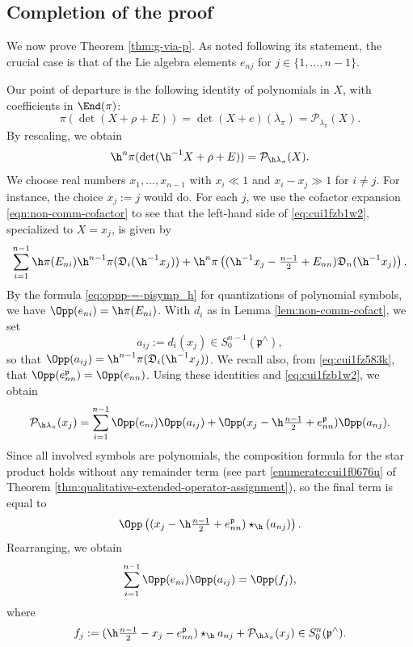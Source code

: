 \subsection{Completion of the proof}\label{sec:completion-proof-2}
We now prove Theorem \ref{thm:g-via-p}.  As noted following its statement, the crucial case is that of the Lie algebra elements $e_{n j}$ for $j \in \{1,\dotsc,n-1\}$.

Our point of departure is the following identity of polynomials in $X$, with coefficients in $\End(\pi)$:
\[
  \pi(\det(X + \rho + E)) = \det(X+e)(\lambda_\pi) = \mathcal{P}_{\lambda_\pi}(X).
\]
By rescaling, we obtain
\begin{equation}\label{eq:cui1fzb1w2}
  \h^{n} \pi(\det(\h^{-1} X + \rho + E)) = \mathcal{P}_{\h \lambda_\pi}(X).
\end{equation}
We choose real numbers $x_1,\dotsc,x_{n-1}$ with $x_i \ll 1$ and $x_i - x_j \gg 1$ for $i \neq j$.  For instance, the choice $x_j := j$ would do.  For each $j$, we use the cofactor expansion \eqref{eqn:non-comm-cofactor} to see that the left-hand side of \eqref{eq:cui1fzb1w2}, specialized to $X = x_j$, is given by
\begin{equation*}
  \sum_{i=1}^{n-1}
  \h \pi(E_{n i}) \h^{n-1}\pi(\mathfrak{D}_i(\h^{-1} x_j))
  + \h^n \pi \left(
    (\h^{-1}x_j - \tfrac{n-1}{2} + E_{n n})\mathfrak{D}_n(\h^{-1} x_j)
  \right).
\end{equation*}
By the formula \eqref{eq:oppp-=-pisymp_h} for quantizations of polynomial symbols, we have $\Opp(e_{n i}) = \h \pi(E_{n i})$.  With $d_i$ as in Lemma \ref{lem:non-comm-cofact}, we set
\begin{equation}\label{eq:aijdixj}
  a_{i j} := d_i(x_j) \in S^{n-1}_0(\mathfrak{p}^\wedge),
\end{equation}
so that $\Opp(a_{i j}) = \h^{n-1}\pi( \mathfrak{D}_i(\h^{-1} x_j))$.  We recall also, from \eqref{eq:cui1fz583k}, that $\Opp(e_{n n}^{\mathfrak{p}}) = \Opp(e_{n n})$.  Using these identities and \eqref{eq:cui1fzb1w2}, we obtain
\begin{equation*}
  \mathcal{P}_{\h \lambda_\pi}(x_j)
  =
  \sum_{i=1}^{n-1}
  \Opp(e_{n i}) \Opp(a_{i j})
  + \Opp (x_j - \h \tfrac{n-1}{2} + e_{n n}^{\mathfrak{p}}) \Opp(a_{n j}).
\end{equation*}
Since all involved symbols are polynomials, the composition formula for the star product holds without any remainder term (see part \eqref{enumerate:cui1f0676u} of Theorem \ref{thm:qualitative-extended-operator-assignment}), so the final term is equal to
\begin{equation*}
  \Opp \left( (x_j - \h \tfrac{n-1}{2} + e_{n n}^{\mathfrak{p}}) \star_{\h}(a_{n j}) \right).
\end{equation*}
Rearranging, we obtain
\begin{equation}\label{eqn:specialized-non-commutative-cofactor}
  \sum_{i=1}^{n-1}
  \Opp(e_{n i})
  \Opp(a_{i j})
  =
  \Opp(f_j),
\end{equation}
where
\[
  f_j := (\h \tfrac{n-1}{2} - x_j - e_{n n}^{\mathfrak{p}}) \star_{\h} a_{n j} + \mathcal{P}_{\h \lambda_\pi}(x_j) \in S^n_0(\mathfrak{p}^\wedge).
\]

